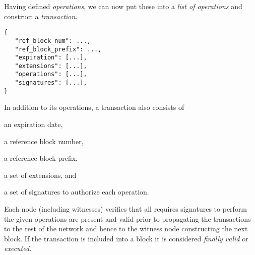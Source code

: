 Having defined \emph{operations}, we can now put these into a \emph{list of
operations} and construct a \emph{transaction}.

\begin{verbatim}
{
   "ref_block_num": ...,
   "ref_block_prefix": ...,
   "expiration": [...],
   "extensions": [...],
   "operations": [...],
   "signatures": [...],
}
\end{verbatim}

In addition to its operations, a transaction also consists of 
\begin{inparaenum}[(a)]
 \item an expiration date,
 \item a reference block number,
 \item a reference block prefix,
 \item a set of extensions, and
 \item a set of signatures to authorize each operation.
\end{inparaenum}

Each node (including witnesses) verifies that all requires signatures to
perform the given operations are present and valid prior to propagating the
transactions to the rest of the network and hence to the witness node
constructing the next block. If the transaction is included into a block it is
considered \emph{finally valid} or \emph{executed}.
